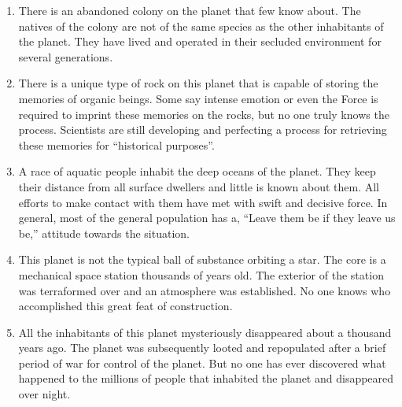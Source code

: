 \documentclass{article}
\begin{document}
\begin{enumerate}
	\item There is an abandoned colony on the planet that few know about. The natives of the colony are not of the same species as the other inhabitants of the planet. They have lived and operated in their secluded environment for several generations.
	\item There is a unique type of rock on this planet that is capable of storing the memories of organic beings. Some say intense emotion or even the Force is required to imprint these memories on the rocks, but no one truly knows the process. Scientists are still developing and perfecting a process for retrieving these memories for “historical purposes”.
	\item A race of aquatic people inhabit the deep oceans of the planet. They keep their distance from all surface dwellers and little is known about them. All efforts to make contact with them have met with swift and decisive force. In general, most of the general population has a, “Leave them be if they leave us be,” attitude towards the situation.
	\item This planet is not the typical ball of substance orbiting a star. The core is a mechanical space station thousands of years old. The exterior of the station was terraformed over and an atmosphere was established. No one knows who accomplished this great feat of construction.
	\item All the inhabitants of this planet mysteriously disappeared about a thousand years ago. The planet was subsequently looted and repopulated after a brief period of war for control of the planet. But no one has ever discovered what happened to the millions of people that inhabited the planet and disappeared over night.
\end{enumerate}
\end{document}
